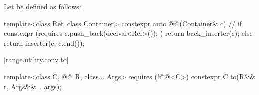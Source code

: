 \pnum
Let  be defined as follows:
\begin{codeblock}
template<class Ref, class Container>
constexpr auto @@(Container& c) {                // \expos
  if constexpr (requires { c.push_back(declval<Ref>()); })
    return back_inserter(c);
  else
    return inserter(c, c.end());
}
\end{codeblock}

[range.utility.conv.to]{}

%
\begin{itemdecl}
template<class C, @@ R, class... Args> requires (!@@<C>)
  constexpr C to(R&& r, Args&&... args);
\end{itemdecl}

